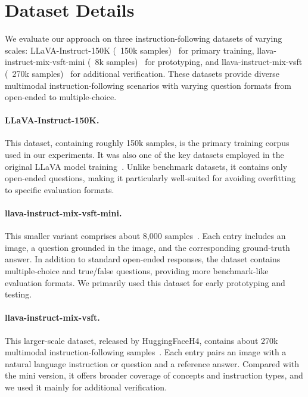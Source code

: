 \documentclass[11pt]{article}
\begin{document}



\appendix
\section{Dataset Details}
\label{app:datasets}


We evaluate our approach on three instruction-following datasets of varying scales: LLaVA-Instruct-150K (~150k samples)~\citep{liu2023llava} for primary training, llava-instruct-mix-vsft-mini (~8k samples)~\citep{unsloth_llava_instruct_mix_vsft_mini} for prototyping, and llava-instruct-mix-vsft (~270k samples)~\citep{huggingfaceh4_llava_instruct_mix_vsft} for additional verification. These datasets provide diverse multimodal instruction-following scenarios with varying question formats from open-ended to multiple-choice. 

\paragraph{LLaVA-Instruct-150K.} 
This dataset, containing roughly 150k samples, is the primary training corpus used in our experiments. It was also one of the key datasets employed in the original LLaVA model training~\citep{liu2023llava}. Unlike benchmark datasets, it contains only open-ended questions, making it particularly well-suited for avoiding overfitting to specific evaluation formats. 

\paragraph{llava-instruct-mix-vsft-mini.} 
This smaller variant comprises about 8{,}000 samples~\citep{unsloth_llava_instruct_mix_vsft_mini}. Each entry includes an image, a question grounded in the image, and the corresponding ground-truth answer. In addition to standard open-ended responses, the dataset contains multiple-choice and true/false questions, providing more benchmark-like evaluation formats. We primarily used this dataset for early prototyping and testing.  

\paragraph{llava-instruct-mix-vsft.} 
This larger-scale dataset, released by HuggingFaceH4, contains about 270k multimodal instruction-following samples~\citep{huggingfaceh4_llava_instruct_mix_vsft}. Each entry pairs an image with a natural language instruction or question and a reference answer. Compared with the mini version, it offers broader coverage of concepts and instruction types, and we used it mainly for additional verification.
\end{document}
